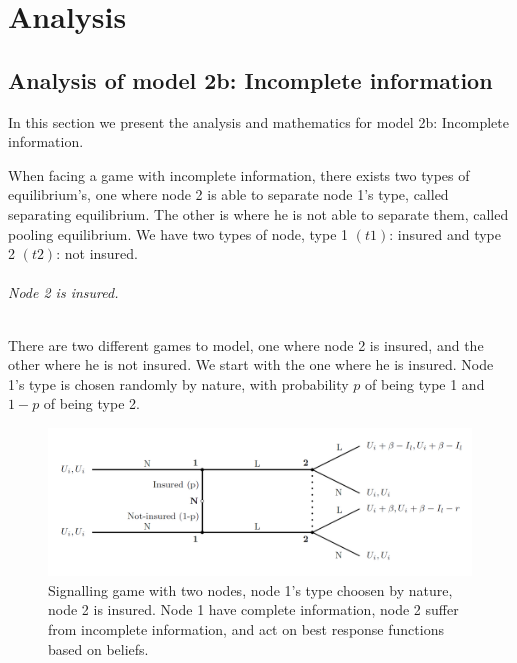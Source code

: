 \chapter{Analysis}
\section{Analysis of model 2b: Incomplete information}
\label{ch:analysis-of-model-2b}
In this section we present the analysis and mathematics for model 2b: Incomplete information.

When facing a game with incomplete information, there exists two types of equilibrium's, one where node 2 is able to separate node 1's type, called separating equilibrium. The other is where he is not able to separate them, called pooling equilibrium. 
We have two types of node, type 1 $(t1)$: insured and type 2 $(t2)$: not insured. 

\subparagraph{Node 2 is insured.}There are two different games to model, one where node 2 is insured, and the other where he is not insured. We start with the one where he is insured.
Node 1's type is chosen randomly by nature, with probability $p$ of being type 1 and $1-p$ of being type 2.
\begin{figure}[h]
\centering
  \centering
\includegraphics[width=1\linewidth]{../Figures/SignalingGameInsured.png}

\caption[Leader/Follower game, node 1's type is chosen by nature, and node 2 is insured]{Signalling game with two nodes, node 1's type choosen by nature, node 2 is insured. Node 1 have complete information, node 2 suffer from incomplete information, and act on best response functions based on beliefs. \label{fig:signalingInsured}}

\end{figure}

